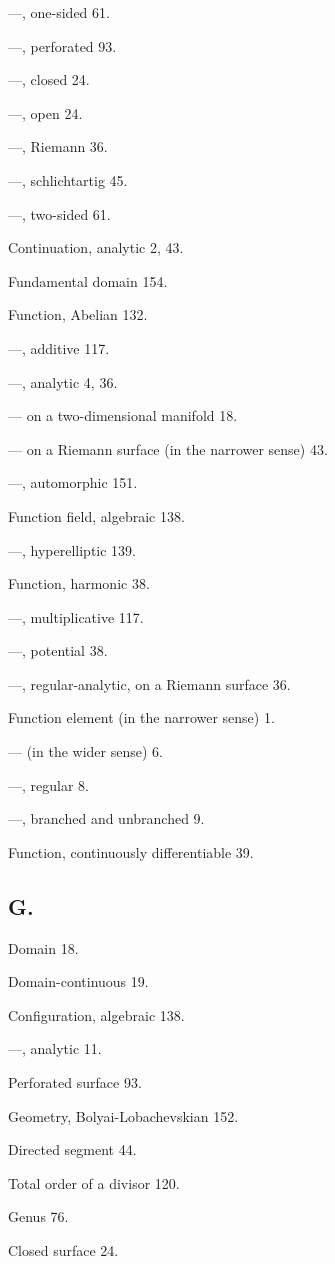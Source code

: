 \documentclass{article}
\begin{document}
---, one-sided 61.

---, perforated 93.

---, closed 24.

---, open 24.

---, Riemann 36.

---, schlichtartig 45.

---, two-sided 61.

Continuation, analytic 2, 43.

Fundamental domain 154.

Function, Abelian 132.

---, additive 117.

---, analytic 4, 36.

--- on a two-dimensional manifold 18.

--- on a Riemann surface (in the narrower sense) 43.

---, automorphic 151.

Function field, algebraic 138.

---, hyperelliptic 139.

Function, harmonic 38.

---, multiplicative 117.

---, potential 38.

---, regular-analytic, on a Riemann surface 36.

Function element (in the narrower sense) 1.

--- (in the wider sense) 6.

---, regular 8.

---, branched and unbranched 9.

Function, continuously differentiable 39.

\subsection*{G.}

Domain 18.

Domain-continuous 19.

Configuration, algebraic 138.

---, analytic 11.

Perforated surface 93.

Geometry, Bolyai-Lobachevskian 152.

Directed segment 44.

Total order of a divisor 120.

Genus 76.

Closed surface 24.
\end{document}

